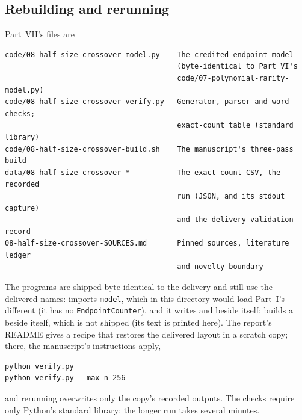 \documentclass[11pt,a4paper]{article}
\theoremstyle{definition}\newaliascnt{definition}{theorem}
\theoremstyle{remark}\newaliascnt{remark}{theorem}
\begin{document}
\subsection{Rebuilding and rerunning}
\label{hc:sec:reproduce}
Part~VII's files are
\begin{lstlisting}
code/08-half-size-crossover-model.py    The credited endpoint model
                                        (byte-identical to Part VI's
                                        code/07-polynomial-rarity-model.py)
code/08-half-size-crossover-verify.py   Generator, parser and word checks;
                                        exact-count table (standard library)
code/08-half-size-crossover-build.sh    The manuscript's three-pass build
data/08-half-size-crossover-*           The exact-count CSV, the recorded
                                        run (JSON, and its stdout capture)
                                        and the delivery validation record
08-half-size-crossover-SOURCES.md       Pinned sources, literature ledger
                                        and novelty boundary
\end{lstlisting}
The programs are shipped byte-identical to the delivery and still use the
delivered names:  imports \texttt{model}, which in this
directory would load Part~I's different  (it has no
\texttt{EndpointCounter}), and it writes  and
 beside itself;  builds a
 beside itself, which is not shipped (its text
is printed here). The report's README gives a recipe that restores the
delivered layout in a scratch copy; there, the manuscript's instructions
apply,
\begin{verbatim}
python verify.py
python verify.py --max-n 256
\end{verbatim}
and rerunning overwrites only the copy's recorded outputs. The checks require
only Python's standard library; the longer run takes several minutes.
\end{document}
